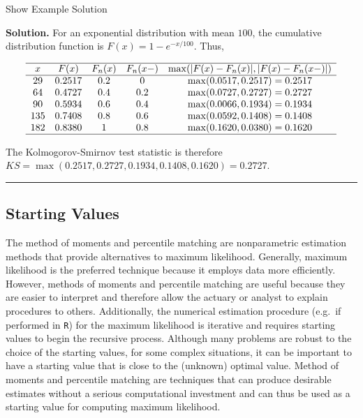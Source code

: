 \documentclass[]{book}
\theoremstyle{definition}
\theoremstyle{definition}
\theoremstyle{definition}
\theoremstyle{remark}
\begin{document}
Show Example Solution

\hypertarget{toggleExampleSelect.1.7}{}
\textbf{Solution.} For an exponential distribution with mean \(100\),
the cumulative distribution function is \(F(x)=1-e^{-x/100}\). Thus,

\[\begin{array}{ccccc}
\hline
x & F(x) & F_n(x) & F_n(x-) & \max(|F(x)-F_n(x)|,|F(x)-F_n(x-)|) \\
\hline 
29  & 0.2517 & 0.2 & 0   & \max(0.0517, 0.2517) = 0.2517 \\
64  & 0.4727 & 0.4 & 0.2 & \max(0.0727, 0.2727) = 0.2727 \\
90  & 0.5934 & 0.6 & 0.4 & \max(0.0066, 0.1934) = 0.1934 \\
135 & 0.7408 & 0.8 & 0.6 & \max(0.0592, 0.1408) = 0.1408 \\
182 & 0.8380 & 1   & 0.8 & \max(0.1620, 0.0380) = 0.1620 \\
\hline
\end{array}\]

The Kolmogorov-Smirnov test statistic is therefore
\(KS = \max(0.2517, 0.2727, 0.1934, 0.1408, 0.1620) = 0.2727\).

\begin{center}\rule{0.5\linewidth}{\linethickness}\end{center}

\subsection{Starting Values}\label{starting-values}

The method of moments and percentile matching are nonparametric
estimation methods that provide alternatives to maximum likelihood.
Generally, maximum likelihood is the preferred technique because it
employs data more efficiently. However, methods of moments and
percentile matching are useful because they are easier to interpret and
therefore allow the actuary or analyst to explain procedures to others.
Additionally, the numerical estimation procedure (e.g.~if performed in
\texttt{R}) for the maximum likelihood is iterative and requires
starting values to begin the recursive process. Although many problems
are robust to the choice of the starting values, for some complex
situations, it can be important to have a starting value that is close
to the (unknown) optimal value. Method of moments and percentile
matching are techniques that can produce desirable estimates without a
serious computational investment and can thus be used as a starting
value for computing maximum likelihood.
\end{document}
